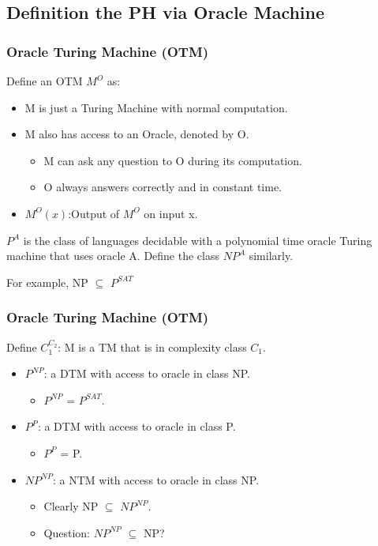 \documentclass{beamer}
\begin{document}
\subsection{Definition the PH via Oracle Machine}
\begin{frame}
\frametitle{Oracle Turing Machine (OTM)}
Define an OTM $M^{O}$ as:\\
\begin{itemize}
	\item M is just a Turing Machine with normal computation.
	\item M also has access to an Oracle, denoted by O.
	\begin{itemize}
		\item M can ask any question to O during its computation.
		\item O always answers correctly and in constant time.
	\end{itemize}
	\item $M^{O}(x)$:Output of $M^{O}$ on input x.
\end{itemize}
\begin{definition}[$P^{A}$ and $NP^{A}$]
	$P^{A}$ is the class of languages decidable with a polynomial time oracle Turing machine that uses oracle A. Define the class $NP^{A}$ similarly.
\end{definition}
For example, NP $\subseteq$ $P^{SAT}$
\end{frame}
\begin{frame}
\frametitle{Oracle Turing Machine (OTM)}
Define $C_{1}^{C_{2}}$: M is a TM that is in complexity class $C_{1}$.
\begin{itemize}
	\item $P^{NP}$: a DTM with access to oracle in class NP.
	\begin{itemize}
		\item $P^{NP}$ = $P^{SAT}$.
	\end{itemize}
	\item $P^{P}$: a DTM with access to oracle in class P.
	\begin{itemize}
		\item $P^{P}$ = P.
	\end{itemize}
	\item $NP^{NP}$: a NTM with access to oracle in class NP.
	\begin{itemize}
		\item Clearly NP $\subseteq$ $NP^{NP}$.
		\item Question: $NP^{NP}$ $\subseteq$ NP?\\
	\end{itemize}
\end{itemize}

\end{frame}
\end{document}
